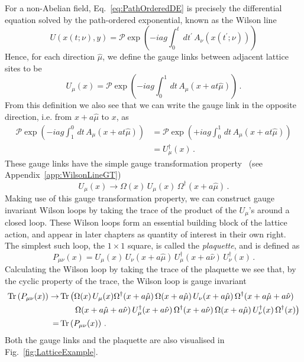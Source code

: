 For a non-Abelian field, Eq.~\eqref{eq:PathOrderedDE} is precisely the differential equation solved by the path-ordered exponential, known as the Wilson line
%
\begin{equation}
U(x(t;\nu),y) = \mathcal{P}\exp\left(-iag\int_0^t \,dt^\prime \,A_\nu(x(t^\prime;\nu))\right)
\end{equation}
%
Hence, for each direction $\hat{\mu}$, we define the gauge links between adjacent lattice sites to be
%
\begin{equation}
U_\mu(x) = \mathcal{P}\exp\left(-iag\int_0^1 \,dt \,A_\mu(x + at\hat{\mu})\right)\, .
\label{eq:GaugeLink}
\end{equation}
%
From this definition we also see that we can write the gauge link in the opposite direction, i.e. from $x+a\hat{\mu}$ to $x$, as
%
\begin{align}
\mathcal{P}\exp\left(-iag\int^0_1 \,dt\,A_\mu(x + at\hat{\mu})\right) &= \mathcal{P}\exp\left(+iag\int_0^1 \,dt\,A_\mu(x + at\hat{\mu})\right)\nonumber\\
&=U^\dag_\mu(x)\, .
\end{align}
%
These gauge links have the simple gauge transformation property~\cite{Lepage:1998dt} (see Appendix~\ref{app:WilsonLineGT})
%
\begin{equation}
U_\mu(x)\rightarrow \Omega(x)\,U_\mu(x)\,\Omega^\dag(x+a\hat{\mu})\, .
\label{eq:LinkTransformation}
\end{equation}
%
Making use of this gauge transformation property, we can construct gauge invariant Wilson loops by taking the trace of the product of the $U_\mu$'s around a closed loop. These Wilson loops form an essential building block of the lattice action, and  appear in later chapters as quantity of interest in their own right. The simplest such loop, the $1\times 1$ square, is called the \textit{plaquette}, and is defined as
\begin{equation}
P_{\mu\nu}(x) = U_\mu(x)\,U_\nu(x+a\hat{\mu})\, U_\mu^\dag(x+a\hat{\nu})\, U_\nu^\dag(x)\, .
\label{eq:Plaquette}
\end{equation}
Calculating the Wilson loop by taking the trace of the plaquette we see that, by the cyclic property of the trace, the Wilson loop is gauge invariant
\begin{align}
\operatorname{Tr}\left(P_{\mu\nu}(x)\right)\rightarrow& \operatorname{Tr} \left(\Omega(x)\,U_\mu(x)\Omega^\dag(x+a\hat{\mu})\,\Omega(x+a\hat{\mu})\,U_\nu(x+a\hat{\mu})\,\Omega^\dag(x+a\hat{\mu}+a\hat{\nu})\right.\nonumber\\
&~~~~~\left.\Omega(x+a\hat{\mu}+a\hat{\nu})\,U_\mu^\dag(x+a\hat{\nu})\,\Omega^\dag(x+a\hat{\nu})\,\Omega(x+a\hat{\mu})\, U_\nu^\dag(x)\,\Omega^\dag(x)\right)\nonumber\\
=&\operatorname{Tr}\left(P_{\mu\nu}(x)\right)\, .
\end{align}
Both the gauge links and the plaquette are also visualised in Fig.~\ref{fig:LatticeExample}.\\

